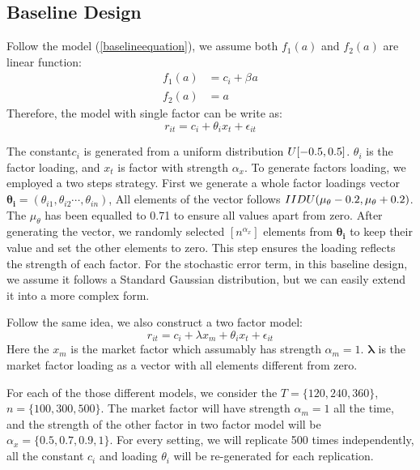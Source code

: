 	\subsection{Baseline Design}\label{base}
	Follow the model (\ref{baselineequation}), we assume both $f_1(a)$ and $f_2(a)$ are linear function:
	\begin{align*}
	f_1(a ) &= c_{i} +\beta_{} a\\
	f_2(a) &=a
	\end{align*}
	Therefore, the model with single factor can be write as:
	\[   r_{it} = c_i +   \theta_{i}x_{t} +\epsilon_{it}   \]
	
	The constant$c_i$ is generated from a uniform distribution $\mathnormal{U}[-0.5, 0.5]$.
	$\theta_{i}$ is the factor loading, and $x_t$ is factor with strength $\alpha_{x}$.
	To generate factors loading, we employed a two steps strategy.
	First we generate a whole factor loadings vector $\mathbf{\theta_i} = (\theta_{i1}, \theta_{i2} \cdots, \theta_{in})$,
	All elements of the vector follows $\mathnormal{IIDU}(\mu_{\theta} -0.2, \mu_{\theta} + 0.2)$. 
	The $\mu_{\theta}$ has been equalled to 0.71 to ensure all values apart from zero. 
	After generating the vector, we randomly selected $[n^{\alpha_{x}}]$ elements from $\mathbf{\theta_i}$ to keep their value and set the other elements to zero. 
	This step ensures the loading reflects the strength of each factor. 
	For the stochastic error term, in this baseline design, we assume it follows a Standard Gaussian distribution, but we can easily extend it into a more complex form.
	
	Follow the same idea, we also construct a two factor model:
	\[   r_{it} = c_i + \lambda x_m  + \theta_{i}x_{t} +\epsilon_{it}   \]
	Here the $x_m$ is the market factor which assumably  has strength $\alpha_{m} = 1$. 
	$\mathbf{\lambda}$ is the market factor loading as a vector with all elements different from zero. 
	
	For each of the those different models, we consider the $T = \{120, 240, 360\}$, $n =\{100, 300, 500\} $.
	The market factor will have strength $\alpha_m = 1$ all the time, and the strength of the other factor in two factor model will be $\alpha_{x} = \{0.5, 0.7, 0.9,1\}$. For every setting, we will replicate 500 times independently, all the constant $c_i$ and loading $\theta_i$ will be re-generated for each replication.
\newpage

